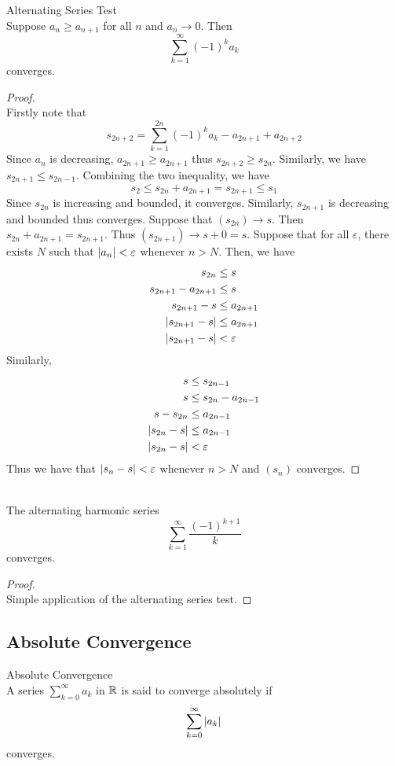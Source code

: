 \documentclass[a4paper]{article}
\begin{document}
\begin{thm}{Alternating Series Test}{}\\ Suppose $a_n\geq a_{n+1}$ for all $n$ and $a_n\to0$. Then $$\sum_{k=1}^{\infty}(-1)^ka_k$$ converges. 
\begin{proof}\\ Firstly note that $$s_{2n+2}=\sum_{k=1}^{2n}(-1)^ka_k-a_{2n+1}+a_{2n+2}$$ Since $a_n$ is decreasing, $a_{2n+1}\geq a_{2n+1}$ thus $s_{2n+2}\geq s_{2n}$. Similarly, we have $s_{2n+1}\leq s_{2n-1}$. Combining the two inequality, we have $$s_2\leq s_{2n}+a_{2n+1}=s_{2n+1}\leq s_1$$ Since $s_{2n}$ is increasing and bounded, it converges. Similarly, $s_{2n+1}$ is decreasing and bounded thus converges. Suppose that $(s_{2n})\to s$. Then $s_{2n}+a_{2n+1}=s_{2n+1}$. Thus $(s_{2n+1})\to s+0=s$. Suppose that for all $\varepsilon$, there exists $N$ such that $\abs{a_{n}}<\varepsilon$ whenever $n>N$. Then, we have
\begin{align*}
s_{2n}&\leq s\\
s_{2n+1}-a_{2n+1}&\leq s\\
s_{2n+1}-s&\leq a_{2n+1}\\
\abs{s_{2n+1}-s}&\leq a_{2n+1}\\
\abs{s_{2n+1}-s}&<\varepsilon\\
\end{align*}
Similarly, 
\begin{align*}
s&\leq s_{2n-1}\\
s&\leq s_{2n}-a_{2n-1}\\
s-s_{2n}&\leq a_{2n-1}\\
\abs{s_{2n}-s}&\leq a_{2n-1}\\
\abs{s_{2n}-s}&<\varepsilon\\
\end{align*}
Thus we have that $\abs{s_n-s}<\varepsilon$ whenever $n>N$ and $(s_n)$ converges. 
\end{proof}
\end{thm}

\begin{lmm}{}{}\\ The alternating harmonic series $$\sum_{k=1}^{\infty}\frac{(-1)^{k+1}}{k}$$ converges. 
\begin{proof}\\ Simple application of the alternating series test. 
\end{proof}
\end{lmm}

\subsection{Absolute Convergence}
\begin{defn}{Absolute Convergence}{}\\ A series $\sum_{k=0}^\infty a_k$ in $\mathbb{R}$ is said to converge absolutely if $$\sum_{k=0}^\infty\abs{a_k}$$ converges.
\end{defn}
\end{document}
